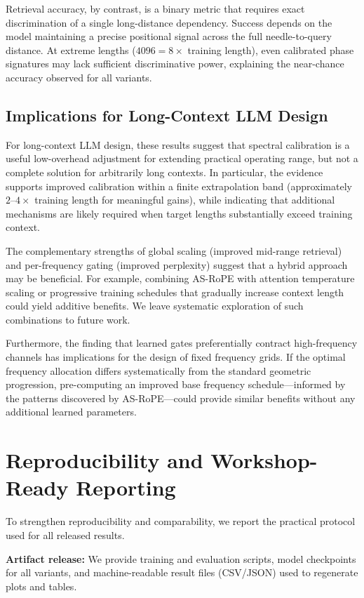 \documentclass[conference]{IEEEtran}
\begin{document}
Retrieval accuracy, by contrast, is a binary metric that requires exact discrimination of a single long-distance dependency. Success depends on the model maintaining a precise positional signal across the full needle-to-query distance. At extreme lengths ($4096 = 8\times$ training length), even calibrated phase signatures may lack sufficient discriminative power, explaining the near-chance accuracy observed for all variants.

\subsection{Implications for Long-Context LLM Design}
For long-context LLM design, these results suggest that spectral calibration is a useful low-overhead adjustment for extending practical operating range, but not a complete solution for arbitrarily long contexts. In particular, the evidence supports improved calibration within a finite extrapolation band (approximately $2$--$4\times$ training length for meaningful gains), while indicating that additional mechanisms are likely required when target lengths substantially exceed training context.

The complementary strengths of global scaling (improved mid-range retrieval) and per-frequency gating (improved perplexity) suggest that a hybrid approach may be beneficial. For example, combining AS-RoPE with attention temperature scaling or progressive training schedules that gradually increase context length could yield additive benefits. We leave systematic exploration of such combinations to future work.

Furthermore, the finding that learned gates preferentially contract high-frequency channels has implications for the design of fixed frequency grids. If the optimal frequency allocation differs systematically from the standard geometric progression, pre-computing an improved base frequency schedule---informed by the patterns discovered by AS-RoPE---could provide similar benefits without any additional learned parameters.

\section{Reproducibility and Workshop-Ready Reporting}
To strengthen reproducibility and comparability, we report the practical protocol used for all released results.

\textbf{Artifact release:} We provide training and evaluation scripts, model checkpoints for all variants, and machine-readable result files (CSV/JSON) used to regenerate plots and tables.
\end{document}
